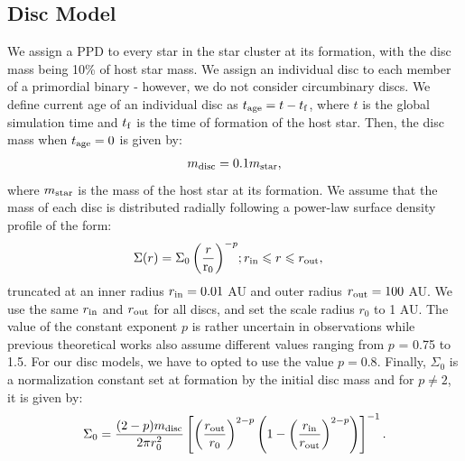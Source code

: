 \documentclass[fleqn,usenatbib]{mnras}
\begin{document}
\subsection{Disc Model} \label{subsec:discmodel}
We assign a PPD to every star in the star cluster at its formation, with the disc mass being 10\% of host star mass. We assign an individual disc to each member of a primordial binary - however, we do not consider circumbinary discs. We define current age of an individual disc as $t_{\rm{age}} = t - t_{\rm{f}}$, where $t$ is the global simulation time and $t_{\rm{f}}$ is the time of formation of the host star. Then, the disc mass when $t_{\rm{age}} = 0$ is given by:
\begin{eqnarray}
    m_{\rm{disc}} = 0.1 m_{\rm{star}},
    \label{eqn:initialdiscmass}
\end{eqnarray}
where $m_{\rm{star}}$ is the mass of the host star at its formation. We assume that the mass of each disc is distributed radially following a power-law surface density profile of the form:
\begin{eqnarray}
    \Sigma (r) = \Sigma_0 \left(\frac{r}{\rm r_0}\right)^{-p} &; r_{\rm in} \leq r \leq r_{\rm out},
    \label{eqn:initialsurfacedensity}
\end{eqnarray}
truncated at an inner radius $r_{\rm in} = 0.01$ AU and outer radius $r_{\rm out}= 100$ AU. We use the same $r_{\rm in}$ and $r_{\rm out}$ for all discs, and set the scale radius $r_0$ to 1 AU. The value of the constant exponent $p$ is rather uncertain in observations while previous theoretical works also assume different values \citep[see, e.g.,][]{Steinhausen2012A&A...538A..10S} ranging from $p$ = 0.75 to 1.5. For our disc models, we have to opted to use the value $p = 0.8$.
Finally, $\Sigma_0$ is a normalization constant set at formation by the initial disc mass and for $p \neq 2$, it is given by: 
\begin{equation}
    \Sigma_0 = \frac{ (2-p) m_{\rm{disc}}}{2\pi r_0^2}  \left[ \left(\frac{r_{\rm out}}{r_0}\right)^{2-p} \left(1- \left(\frac{r_{\rm in}}{r_{\rm out}}\right)^{2-p}\right) \right]^{-1}.
    \label{eqn:initialsurfacedensityconstant}
\end{equation}
\end{document}
